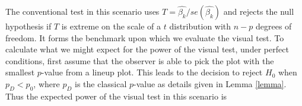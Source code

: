 \documentclass{article}
\newcommand{\red}[1]{{\color{red} #1}}
\begin{document}

The conventional test in this scenario uses $T= \hat{\beta_k}/ se(\hat{\beta_k})$ and rejects the null hypothesis if $T$ is extreme on the scale of a $t$ distribution with $n-p$ degrees of freedom.  It forms the benchmark upon which we evaluate the visual test. To calculate what we might expect for the power of the visual test, under perfect conditions, first assume that the observer is able to pick the plot with the smallest $p$-value from a lineup plot.  This leads to the decision to reject $H_0$ when $p_{D} < p_0$, where $p_{D}$ is the classical $p$-value as details given in Lemma \ref{lemma}. Thus the expected power of the visual test in this scenario is
\end{document}
